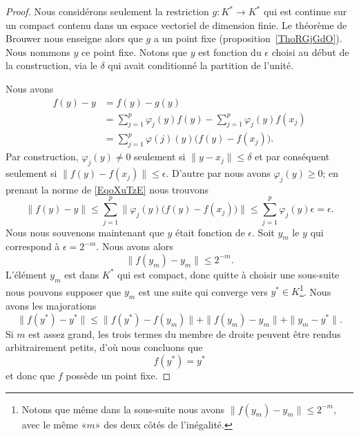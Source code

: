 \begin{proof}
    Nous considérons seulement la restriction \( g\colon K^*\to K^*\) qui est continue sur un compact contenu dans un espace vectoriel de dimension finie. Le théorème de Brouwer nous enseigne alors que \( g\) a un point fixe (proposition~\ref{ThoRGjGdO}). Nous nommons \( y\) ce point fixe. Notons que \( y\) est fonction du \( \epsilon\) choisi au début de la construction, via le \( \delta\) qui avait conditionné la partition de l'unité.

    Nous avons
    \begin{subequations}        \label{EqoXuTzE}
        \begin{align}
            f(y)-y&=f(y)-g(y)\\
            &=\sum_{j=1}^p\varphi_j(y)f(y)-\sum_{j=1}^p\varphi_j(y)f(x_j)\\
            &=\sum_{j=1}^p\varphi(j)(y)\big( f(y)-f(x_j) \big).
        \end{align}
    \end{subequations}
    Par construction, \( \varphi_j(y)\neq 0\) seulement si \( \| y-x_j \|\leq \delta\) et par conséquent seulement si \( \| f(y)-f(x_j) \|\leq \epsilon\). D'autre par nous avons \( \varphi_j(y)\geq 0\); en prenant la norme de \eqref{EqoXuTzE} nous trouvons
    \begin{equation}
        \| f(y)-y \|\leq \sum_{j=1}^p\| \varphi_j(y)\big( f(y)-f(x_j) \big) \|\leq \sum_{j=1}^p\varphi_j(y)\epsilon=\epsilon.
    \end{equation}
    Nous nous souvenons maintenant que \( y\) était fonction de \( \epsilon\). Soit \( y_m\) le \( y\) qui correspond à \( \epsilon=2^{-m}\). Nous avons alors
    \begin{equation}
        \| f(y_m)-y_m \|\leq 2^{-m}.
    \end{equation}
    L'élément \( y_m\) est dans \( K^*\) qui est compact, donc quitte à choisir une sous-suite nous pouvons supposer que \( y_m\) est une suite qui converge vers \( y^*\in K\)\footnote{Notons que même dans la sous-suite nous avons \( \| f(y_m)-y_m \|\leq 2^{-m}\), avec le même «\( m\)» des deux côtés de l'inégalité.}. Nous avons les majorations
    \begin{equation}
        \| f(y^*)-y^* \|\leq \| f(y^*)-f(y_m) \|+\| f(y_m)-y_m \|+\| y_m-y^* \|.
    \end{equation}
    Si \( m\) est assez grand, les trois termes du membre de droite peuvent être rendus arbitrairement petits, d'où nous concluons que
    \begin{equation}
        f(y^*)=y^*
    \end{equation}
    et donc que \( f\) possède un point fixe.
\end{proof}


